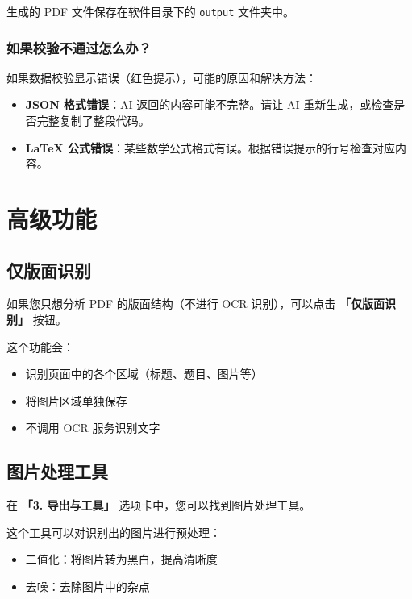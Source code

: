 \documentclass[UTF8,zihao=-4,openany]{ctexbook}
\begin{document}
\begin{TipBox}
	生成的 PDF 文件保存在软件目录下的 \texttt{output} 文件夹中。
\end{TipBox}

\subsection{如果校验不通过怎么办？}

如果数据校验显示错误（红色提示），可能的原因和解决方法：

\begin{itemize}
	\item \textbf{JSON 格式错误}：AI 返回的内容可能不完整。请让 AI 重新生成，或检查是否完整复制了整段代码。
	\item \textbf{LaTeX 公式错误}：某些数学公式格式有误。根据错误提示的行号检查对应内容。
\end{itemize}

\chapter{高级功能}

\section{仅版面识别}

如果您只想分析 PDF 的版面结构（不进行 OCR 识别），可以点击 \textbf{「仅版面识别」} 按钮。

这个功能会：
\begin{itemize}
	\item 识别页面中的各个区域（标题、题目、图片等）
	\item 将图片区域单独保存
	\item 不调用 OCR 服务识别文字
\end{itemize}

\section{图片处理工具}

在 \textbf{「3. 导出与工具」} 选项卡中，您可以找到图片处理工具。

这个工具可以对识别出的图片进行预处理：
\begin{itemize}
	\item 二值化：将图片转为黑白，提高清晰度
	\item 去噪：去除图片中的杂点
\end{itemize}
\end{document}
